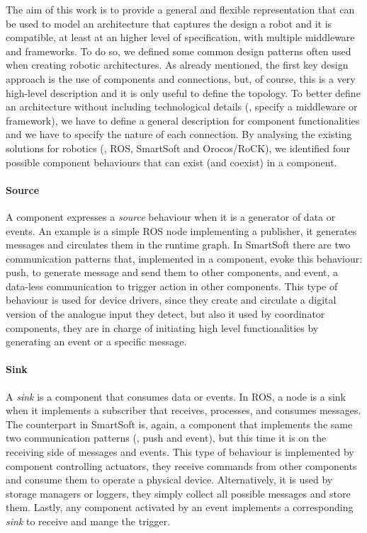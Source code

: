The aim of this work is to provide a general and flexible representation that can be used to model an architecture that captures the design a robot and it is compatible, at least at an higher level of specification, with multiple middleware and frameworks. To do so, we defined some common design patterns often used when creating robotic architectures. As already mentioned, the first key design approach is the use of components and connections, but, of course, this is a very high-level description and it is only useful to define the topology. To better define an architecture without including technological details (\ie, specify a middleware or framework), we have to define a general description for component functionalities and we have to specify the nature of each connection. By analysing the existing solutions for robotics (\ie, ROS, SmartSoft and Orocos/RoCK), we identified four possible component behaviours that can exist (and coexist) in a component.

\paragraph{Source} A component expresses a \textit{source} behaviour when it is a generator of data or events. An example is a simple ROS node implementing a publisher, it generates messages and circulates them in the runtime graph. In SmartSoft there are two communication patterns that, implemented in a component, evoke this behaviour: push, to generate message and send them to other components, and event, a data-less communication to trigger action in other components. This type of behaviour is used for device drivers, since they create and circulate a digital version of the analogue input they detect, but also it used by coordinator components, they are in charge of initiating high level functionalities by generating an event or a specific message.

\paragraph{Sink} A \textit{sink} is a component that consumes data or events. In ROS, a node is a sink when it implements a subscriber that receives, processes, and consumes messages. The counterpart in SmartSoft is, again, a component that implements the same two communication patterns (\ie, push and event), but this time it is on the receiving side of messages and events. This type of behaviour is implemented by component controlling actuators, they receive commands from other components and consume them to operate a physical device. Alternatively, it is used by storage managers or loggers, they simply collect all possible messages and store them. Lastly, any component activated by an event implements a corresponding \textit{sink} to receive and mange the trigger.

